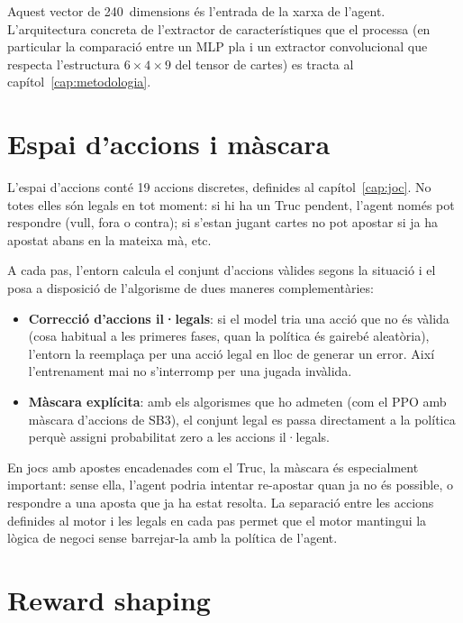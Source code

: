 Aquest vector de 240~dimensions és l'entrada de la xarxa de l'agent. L'arquitectura
concreta de l'extractor de característiques que el processa (en particular la
comparació entre un \acf{MLP} pla i un extractor convolucional que respecta
l'estructura $6 \times 4 \times 9$ del tensor de cartes) es tracta al
capítol~\ref{cap:metodologia}.

\section{Espai d'accions i màscara}
\label{sec:accions-entorn}

L'espai d'accions conté 19 accions discretes, definides al capítol~\ref{cap:joc}. No
totes elles són legals en tot moment: si hi ha un Truc pendent, l'agent només pot
respondre (vull, fora o contra); si s'estan jugant cartes no pot apostar si ja ha
apostat abans en la mateixa mà, etc.

A cada pas, l'entorn calcula el conjunt d'accions vàlides segons la situació i el posa
a disposició de l'algorisme de dues maneres complementàries:

\begin{itemize}
  \item \textbf{Correcció d'accions il·legals}: si el model tria una acció que no és
        vàlida (cosa habitual a les primeres fases, quan la política és gairebé
        aleatòria), l'entorn la reemplaça per una acció legal en lloc de generar un
        error. Així l'entrenament mai no s'interromp per una jugada invàlida.
  \item \textbf{Màscara explícita}: amb els algorismes que ho admeten (com el \ac{PPO}
        amb màscara d'accions de \ac{SB3}), el conjunt legal es passa directament a la
        política perquè assigni probabilitat zero a les accions il·legals.
\end{itemize}

En jocs amb apostes encadenades com el Truc, la màscara és especialment important:
sense ella, l'agent podria intentar re-apostar quan ja no és possible, o respondre
a una aposta que ja ha estat resolta. La separació entre les accions definides al
motor i les legals en cada pas permet que el motor mantingui la lògica de negoci
sense barrejar-la amb la política de l'agent.

\section{Reward shaping}
\label{sec:reward}

